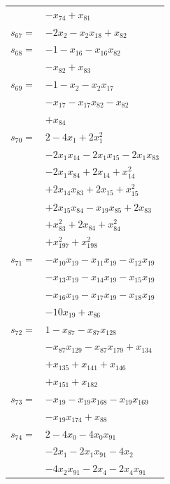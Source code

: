 \begin{longtable}{@{}r@{\;}l@{}}
 & \(\displaystyle -x_{74} +x_{81}\) \\[3pt]
\(s_{67}=\) & \(\displaystyle -2x_{2} -x_{2}x_{18} +x_{82}\) \\[3pt]
\(s_{68}=\) & \(\displaystyle -1 -x_{16} -x_{16}x_{82}\) \\
 & \(\displaystyle -x_{82} +x_{83}\) \\[3pt]
\(s_{69}=\) & \(\displaystyle -1 -x_{2} -x_{2}x_{17}\) \\
 & \(\displaystyle -x_{17} -x_{17}x_{82} -x_{82}\) \\
 & \(\displaystyle +x_{84}\) \\[3pt]
\(s_{70}=\) & \(\displaystyle 2 -4x_{1} +2x_{1}^{2}\) \\
 & \(\displaystyle -2x_{1}x_{14} -2x_{1}x_{15} -2x_{1}x_{83}\) \\
 & \(\displaystyle -2x_{1}x_{84} +2x_{14} +x_{14}^{2}\) \\
 & \(\displaystyle +2x_{14}x_{83} +2x_{15} +x_{15}^{2}\) \\
 & \(\displaystyle +2x_{15}x_{84} -x_{19}x_{85} +2x_{83}\) \\
 & \(\displaystyle +x_{83}^{2} +2x_{84} +x_{84}^{2}\) \\
 & \(\displaystyle +x_{197}^{2} +x_{198}^{2}\) \\[3pt]
\(s_{71}=\) & \(\displaystyle -x_{10}x_{19} -x_{11}x_{19} -x_{12}x_{19}\) \\
 & \(\displaystyle -x_{13}x_{19} -x_{14}x_{19} -x_{15}x_{19}\) \\
 & \(\displaystyle -x_{16}x_{19} -x_{17}x_{19} -x_{18}x_{19}\) \\
 & \(\displaystyle -10x_{19} +x_{86}\) \\[3pt]
\(s_{72}=\) & \(\displaystyle 1 -x_{87} -x_{87}x_{128}\) \\
 & \(\displaystyle -x_{87}x_{129} -x_{87}x_{179} +x_{134}\) \\
 & \(\displaystyle +x_{135} +x_{141} +x_{146}\) \\
 & \(\displaystyle +x_{151} +x_{182}\) \\[3pt]
\(s_{73}=\) & \(\displaystyle -x_{19} -x_{19}x_{168} -x_{19}x_{169}\) \\
 & \(\displaystyle -x_{19}x_{174} +x_{88}\) \\[3pt]
\(s_{74}=\) & \(\displaystyle 2 -4x_{0} -4x_{0}x_{91}\) \\
 & \(\displaystyle -2x_{1} -2x_{1}x_{91} -4x_{2}\) \\
 & \(\displaystyle -4x_{2}x_{91} -2x_{4} -2x_{4}x_{91}\) \\

\end{longtable}
